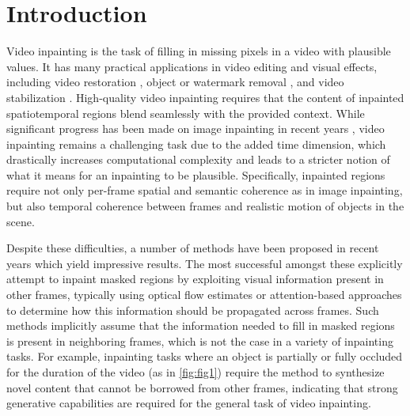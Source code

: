 \chapter{Introduction}
\label{sec:intro}

Video inpainting is the task of filling in missing pixels in a video with plausible values. It has many practical applications in video editing and visual effects, including video restoration \citep{restoration}, object or watermark removal \citep{occluding}, and video stabilization \citep{stabilization}. High-quality video inpainting requires that the content of inpainted spatiotemporal regions blend seamlessly with the provided context. While significant progress has been made on image inpainting in recent years \citep{palette, repaint, imin1, imin3, imin4, imin5}, video inpainting remains a challenging task due to the added time dimension, which drastically increases computational complexity and leads to a stricter notion of what it means for an inpainting to be plausible. Specifically, inpainted regions require not only per-frame spatial and semantic coherence as in image inpainting, but also temporal coherence between frames and realistic motion of objects in the scene.  


Despite these difficulties, a number of methods have been proposed in recent years which yield impressive results. The most successful amongst these explicitly attempt to inpaint masked regions by exploiting visual information present in other frames, typically using optical flow estimates \citep{temporally, endtoend, deepvideoinpainting, dfvi, flowedgeguided} or attention-based approaches \citep{learningjoint, fuseformer, onionpeel, copypaste} to determine how this information should be propagated across frames. Such methods implicitly assume that the information needed to fill in masked regions is present in neighboring frames, which is not the case in a variety of inpainting tasks. For example, inpainting tasks where an object is partially or fully occluded for the duration of the video (as in \cref{fig:fig1}) require the method to synthesize novel content that cannot be borrowed from other frames, indicating that strong generative capabilities are required for the general task of video inpainting. 

